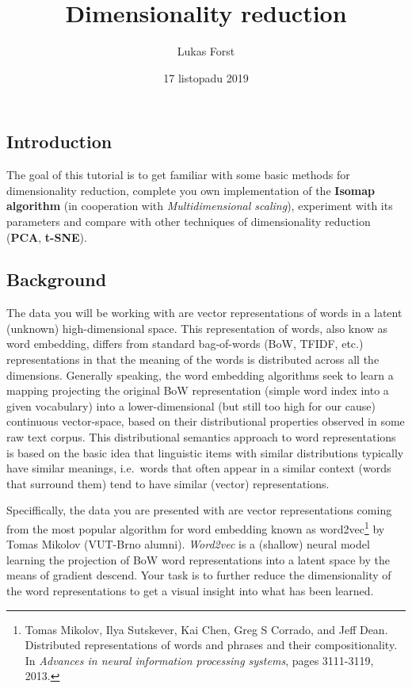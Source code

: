 \documentclass[]{article}
\title{Dimensionality reduction}
\author{Lukas Forst}
\date{17 listopadu 2019}
\let\rmarkdownfootnote\footnote%
\def\footnote{\protect\rmarkdownfootnote}
\begin{document}
\maketitle

\hypertarget{introduction}{%
\subsection{Introduction}\label{introduction}}

The goal of this tutorial is to get familiar with some basic methods for
dimensionality reduction, complete you own implementation of the
\textbf{Isomap algorithm} (in cooperation with \emph{Multidimensional
scaling}), experiment with its parameters and compare with other
techniques of dimensionality reduction (\textbf{PCA}, \textbf{t-SNE}).

\hypertarget{background}{%
\subsection{Background}\label{background}}

The data you will be working with are vector representations of words in
a latent (unknown) high-dimensional space. This representation of words,
also know as word embedding, differs from standard bag-of-words (BoW,
TFIDF, etc.) representations in that the meaning of the words is
distributed across all the dimensions. Generally speaking, the word
embedding algorithms seek to learn a mapping projecting the original BoW
representation (simple word index into a given vocabulary) into a
lower-dimensional (but still too high for our cause) continuous
vector-space, based on their distributional properties observed in some
raw text corpus. This distributional semantics approach to word
representations is based on the basic idea that linguistic items with
similar distributions typically have similar meanings, i.e.~words that
often appear in a similar context (words that surround them) tend to
have similar (vector) representations.

Speciffically, the data you are presented with are vector
representations coming from the most popular algorithm for word
embedding known as word2vec\footnote{Tomas Mikolov, Ilya Sutskever, Kai
  Chen, Greg S Corrado, and Jeff Dean. Distributed representations of
  words and phrases and their compositionality. In \emph{Advances in
  neural information processing systems}, pages 3111-3119, 2013.} by
Tomas Mikolov (VUT-Brno alumni). \emph{Word2vec} is a (shallow) neural
model learning the projection of BoW word representations into a latent
space by the means of gradient descend. Your task is to further reduce
the dimensionality of the word representations to get a visual insight
into what has been learned.
\end{document}
